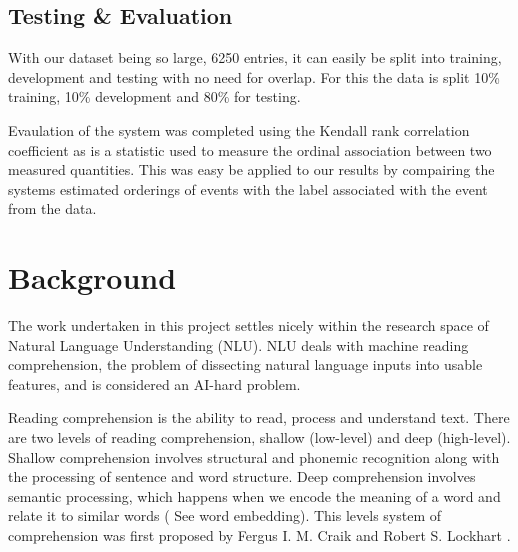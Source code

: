 \documentclass[bsc,frontabs,twoside,singlespacing,parskip,deptreport]{infthesis}     %
\begin{document}



\section{Testing \& Evaluation}
With our dataset being so large, 6250 entries, it can
easily be split into training, development and testing with no
need for overlap. For this the data is split 10\% training,
10\% development and 80\% for testing.

Evaulation of the system was completed using the
Kendall rank correlation coefficient as is a statistic
used to measure the ordinal association between two
measured quantities. This was easy be applied to our results
by compairing the systems estimated orderings of events
with the label associated with the event from the data.

\chapter{Background}
The work undertaken in this project settles nicely within the research space of Natural Language Understanding (NLU).
NLU deals with machine reading comprehension, the problem of dissecting natural language inputs into usable features,
and is considered an AI-hard problem.

Reading comprehension is the ability to read, process and understand text.  
There are two levels of reading comprehension, shallow (low-level) and deep (high-level).
Shallow comprehension involves structural and phonemic recognition along with the processing of sentence and  word
structure.
Deep comprehension involves semantic processing, which happens when we encode the meaning of a word and relate it
to similar words ( See word embedding).
This levels system of comprehension was first proposed by  Fergus I. M. Craik and Robert S. Lockhart \cite{wagner2009beyond}.
\end{document}
